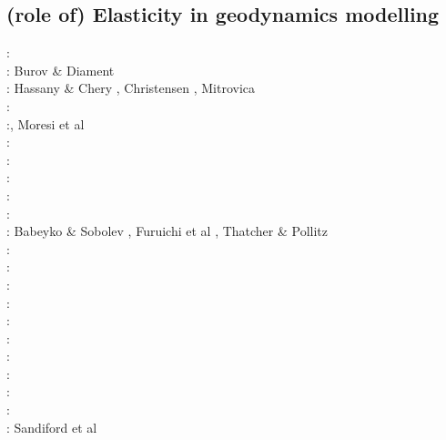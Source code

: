 \cite{haha05}
\cite{erhh13}

\subsection{(role of) Elasticity in geodynamics modelling}

\begin{scriptsize}
\nineteeneightyfour:\cite{yusa84}\\
\nineteenninetyfive: Burov \& Diament \cite{budi95}\\
\nineteenninetysix: Hassany \& Chery \cite{hach96b}, Christensen \cite{chri96b}, Mitrovica \cite{mitr96}\\
\nineteenninetyeight:\cite{copo98}\\
\twothousandone:\cite{vapy01}, Moresi et al \cite{modm01}\\
\twothousandtwo:\cite{mumh02}\cite{modm02}\\
\twothousandthree:\cite{hukm03}\cite{wabu03}\\
\twothousandfive:\cite{mure05}\\
\twothousandsix:\cite{kapo06}\cite{mudm06}\\
\twothousandseven:\cite{kabe07}\\
\twothousandeight: Babeyko \& Sobolev \cite{baso08}, Furuichi et al \cite{fukk08}, 
                   Thatcher \& Pollitz \cite{thpo08}\\
\twothousandnine:\cite{qurj09}\\
\twothousandten:\cite{bepo10}\\
\twothousandtwelve:\cite{gerb12}\cite{kasc12}\\
\twothousandthirteen:\cite{wahd13}\\
\twothousandfourteen:\cite{famc14}\cite{fogm14}\cite{olbe14}\cite{hepk14}\\
\twothousandfifteen:\cite{thkp15}\\
\twothousandsixteen:\cite{bafl16}\cite{jads16}\cite{olbm16}\cite{bafl16}\\
\twothousandseventeen:\cite{pact17}\\
\twothousandeighteen:\cite{dusd18}\\
\twothousandnineteen: \cite{pact19}\\
\twothousandtwenty: Sandiford et al \cite{sams20}
\end{scriptsize}

